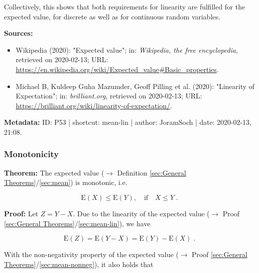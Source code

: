 \documentclass[a4paper,12pt,twoside]{book}
\begin{document}
\vspace{1em}
Collectively, this shows that both requirements for linearity are fulfilled for the expected value, for discrete as well as for continuous random variables.


\vspace{1em}
\textbf{Sources:}
\begin{itemize}
\item Wikipedia (2020): "Expected value"; in: \textit{Wikipedia, the free encyclopedia}, retrieved on 2020-02-13; URL: \url{https://en.wikipedia.org/wiki/Expected_value#Basic_properties}.
\item Michael B, Kuldeep Guha Mazumder, Geoff Pilling et al. (2020): "Linearity of Expectation"; in: \textit{brilliant.org}, retrieved on 2020-02-13; URL: \url{https://brilliant.org/wiki/linearity-of-expectation/}.
\end{itemize}


\vspace{1em}
\textbf{Metadata:} ID: P53 | shortcut: mean-lin | author: JoramSoch | date: 2020-02-13, 21:08.
\vspace{1em}



\subsubsection[\textbf{Monotonicity}]{Monotonicity} \label{sec:mean-mono}
\setcounter{equation}{0}

\textbf{Theorem:} The expected value ($\rightarrow$ Definition \ref{sec:General Theorems}/\ref{sec:mean}) is monotonic, i.e.

\begin{equation} \label{eq:mean-mono-mean-mono}
\mathrm{E}(X) \leq \mathrm{E}(Y), \quad \text{if} \quad X \leq Y \; .
\end{equation}


\vspace{1em}
\textbf{Proof:} Let $Z = Y - X$. Due to the linearity of the expected value ($\rightarrow$ Proof \ref{sec:General Theorems}/\ref{sec:mean-lin}), we have

\begin{equation} \label{eq:mean-mono-mean-XYZ}
\mathrm{E}(Z) = \mathrm{E}(Y-X) = \mathrm{E}(Y) - \mathrm{E}(X) \; .
\end{equation}

With the non-negativity property of the expected value ($\rightarrow$ Proof \ref{sec:General Theorems}/\ref{sec:mean-nonneg}), it also holds that
\end{document}
